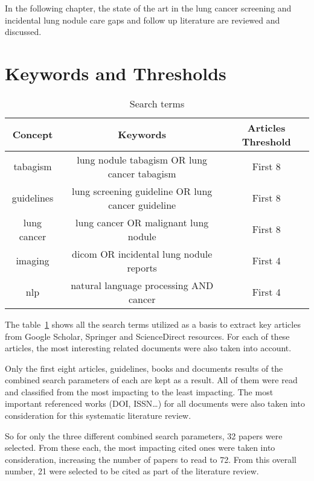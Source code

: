 \label{chap:literature_review}

In the following chapter, the state of the art in the lung cancer screening and incidental lung nodule care gaps and follow up literature are reviewed and discussed.

\section{Keywords and Thresholds}
\begin{center}
\begin{table}

  \begin{tabular}{c|c|c}
    \hline 
    Concept & Keywords & Articles Threshold\tabularnewline
    \hline 
    tabagism & lung nodule tabagism OR lung cancer tabagism & First 8\tabularnewline
    guidelines & lung screening guideline OR lung cancer guideline & First 8\tabularnewline
    lung cancer & lung cancer OR malignant lung nodule & First 8\tabularnewline
    imaging & dicom OR incidental lung nodule reports & First 4\tabularnewline
    nlp & natural language processing AND cancer & First 4\tabularnewline
    \hline 
  \end{tabular}
\par
\caption{\label{table:search_terms} Search terms}
\end{table}
  \vspace*{-44pt}
\end{center}

The table~\ref{table:search_terms} shows all the search terms utilized as a basis to extract key articles from Google Scholar, Springer  and ScienceDirect resources. For each of these articles, the most interesting related documents were also taken into account.

Only the first eight articles, guidelines, books and documents results of the combined search parameters of each are kept as a result. All of them were read and classified from the most impacting to the least impacting. The most important referenced works (DOI, ISSN\ldots) for all documents were also taken into consideration for this systematic literature review.

So for only the three different combined search parameters, 32 papers were selected. From these each, the  most impacting cited ones were taken into consideration, increasing the number of papers to  read to 72. From this overall number, 21 were selected to be cited as part of the literature review.

